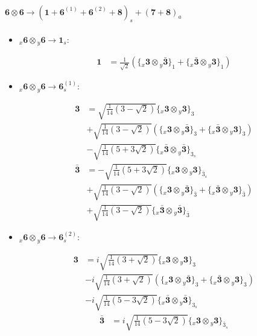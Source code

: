 \documentclass[english]{article}
\newcommand{\cgEqFontsize}{\large}
\newcommand{\rep}[1]{\mathbf{#1}}
\newcommand{\repx}[2]{{}_{#2}\mathbf{#1}}
\newcommand{\tsprod}[2]{\rep{#1}\otimes\rep{#2}}
\newcommand{\tsprodx}[2]{\repx{#1}{x}\otimes\repx{#2}{y}}
\newcommand{\subcgt}[3]{\big\{ \tsprodx{#1}{#2}\big\}^{}_{#3}}
\begin{document}
\paragraph*{\cgEqFontsize $\tsprod{6}{6}\to\left(\rep{1}+\rep{6}^{(1)}+\rep{6}^{(2)}+\rep{8}\right)_s+\left(\rep{7}+\rep{8}\right)_a$}
\begin{itemize}
\item $\tsprodx{6}{6}\to\rep{1}_{s}$:
\begin{fleqn}
\begin{align*}
\rep{1} & = \frac{1}{\sqrt{2}}\left(\subcgt{3}{\bar{3}}{1}+\subcgt{\bar{3}}{3}{1}\right)
\end{align*}
\end{fleqn}
\item $\tsprodx{6}{6}\to\rep{6}_{s}^{(1)}$:
\begin{fleqn}
\begin{align*}
\rep{3} & = \sqrt{\frac{1}{14} \left(3-\sqrt{2}\right)}\subcgt{3}{3}{3} \\ 
 & +\sqrt{\frac{1}{14} \left(3-\sqrt{2}\right)}\left(\subcgt{3}{\bar{3}}{3}+\subcgt{\bar{3}}{3}{3}\right) \\ 
 & -\sqrt{\frac{1}{14} \left(5+3 \sqrt{2}\right)}\subcgt{\bar{3}}{\bar{3}}{3_{s}}
\end{align*}
\begin{align*}
\rep{\bar{3}} & = -\sqrt{\frac{1}{14} \left(5+3 \sqrt{2}\right)}\subcgt{3}{3}{\bar{3}_{s}} \\ 
 & +\sqrt{\frac{1}{14} \left(3-\sqrt{2}\right)}\left(\subcgt{3}{\bar{3}}{\bar{3}}+\subcgt{\bar{3}}{3}{\bar{3}}\right) \\ 
 & +\sqrt{\frac{1}{14} \left(3-\sqrt{2}\right)}\subcgt{\bar{3}}{\bar{3}}{\bar{3}}
\end{align*}
\end{fleqn}
\item $\tsprodx{6}{6}\to\rep{6}_{s}^{(2)}$:
\begin{fleqn}
\begin{align*}
\rep{3} & = i \sqrt{\frac{1}{14} \left(3+\sqrt{2}\right)}\subcgt{3}{3}{3} \\ 
 & -i \sqrt{\frac{1}{14} \left(3+\sqrt{2}\right)}\left(\subcgt{3}{\bar{3}}{3}+\subcgt{\bar{3}}{3}{3}\right) \\ 
 & -i \sqrt{\frac{1}{14} \left(5-3 \sqrt{2}\right)}\subcgt{\bar{3}}{\bar{3}}{3_{s}}
\end{align*}
\begin{align*}
\rep{\bar{3}} & = i \sqrt{\frac{1}{14} \left(5-3 \sqrt{2}\right)}\subcgt{3}{3}{\bar{3}_{s}} \\ 

\end{align*}
\end{fleqn}
\end{itemize}
\end{document}

